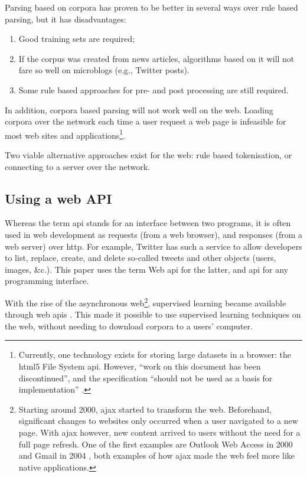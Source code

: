 Parsing based on corpora has proven to be better in several ways over
  rule based parsing, but it has disadvantages:

\begin{enumerate}
\item Good training sets are required;
\item If the corpus was created from news articles, algorithms based on it
  will not fare so well on microblogs (e.g., Twitter posts).
\item Some rule based approaches for pre- and post processing are still
  required.
\end{enumerate}

\noindent In addition, corpora based parsing will not work well on the web.
Loading corpora over the network each time a user request a web page is
  infeasible for most web sites and applications\footnote{Currently,
    one technology exists for storing large datasets in a browser: the
    \acrshort{html5} File System \acrshort{api}. However, ``work on this
    document has been discontinued'', and the specification ``should not be
    used as a basis for implementation'' \autocite{urhane-file-api}.}.

Two viable alternative approaches exist for the web: rule based tokenisation,
  or connecting to a server over the network.

\subsection{Using a web API}\label{using-a-web}

Whereas the term \gls{api} stands for an interface between two programs,
  it is often used in web development as requests (from a web browser),
  and responses (from a web server) over \gls{http}.
For example, Twitter has such a service to allow developers to list,
  replace, create, and delete so-called tweets and other objects (users,
  images, \&c.).
This paper uses the term Web \gls{api} for the latter, and \gls{api} for
any programming interface.

With the rise of the asynchronous web\footnote{Starting around 2000,
    \gls{ajax} started to transform the web.
  Beforehand, significant changes to websites only occurred when a user
    navigated to a new page. 
  With \gls{ajax} however, new content arrived to users without the need
    for a full page refresh. One of the first examples are Outlook Web
    Access in 2000 \autocite{technet-outlook-web-access} and Gmail in 2004
    \autocite{gmailblog-gmail-ajax}, both examples of how \gls{ajax} made
    the web feel more like native applications.},
  supervised learning became available through web \glspl{api}
  \autocites{textteaser-web-api}{wordnet-web-api}{textrazor-web-api}.
This made it possible to use supervised learning techniques on the web,
  without needing to download corpora to a users' computer.

